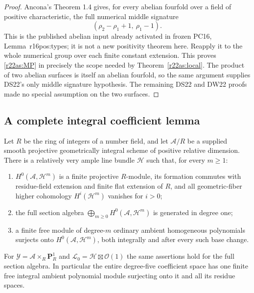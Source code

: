 \begin{proof}
Ancona's Theorem 1.4 gives, for every abelian fourfold
over a field of positive characteristic, the full
numerical middle signature
\[
                 (\rho_2-\rho_1+1,\ \rho_1-1).
 \tag{AS22.2}\label{r22as:Ancona}
\]
This is the published abelian input already activated
in frozen PC16, Lemma~\textup{r16pos:types}; it is not a
new positivity theorem here.  Reapply it to the whole
numerical group over each finite constant extension.
This proves \eqref{r22as:MP} in precisely the scope
needed by Theorem~\ref{r22as:local}.  The product of
two abelian surfaces is itself an abelian fourfold,
so the same argument supplies DS22's only middle
signature hypothesis.  The remaining DS22 and DW22
proofs made no special assumption on the two surfaces.
\end{proof}

\subsection{A complete integral coefficient lemma}

\begin{lemma}
\label{r22as:coeff}
Let $R$ be the ring of integers of a number field, and
let $\mathcal A/R$ be a supplied smooth projective
geometrically integral scheme of positive relative
dimension.  There is a relatively very ample line
bundle $\mathcal H$ such that, for every $m\ge1$:
\begin{enumerate}
\item $H^0(\mathcal A,\mathcal H^m)$ is a finite
projective $R$-module, its formation commutes with
residue-field extension and finite flat extension of
$R$, and all geometric-fiber higher cohomology
$H^i(\mathcal H^m)$ vanishes for $i>0$;
\item the full section algebra
$\bigoplus_{m\ge0}H^0(\mathcal A,\mathcal H^m)$ is
generated in degree one;
\item a finite free module of degree-$m$ ordinary
ambient homogeneous polynomials surjects onto
$H^0(\mathcal A,\mathcal H^m)$, both integrally and
after every such base change.
\end{enumerate}
For $\mathcal Y=\mathcal A\times_R\mathbf P^1_R$ and
$\mathcal L_0=\mathcal H\boxtimes\mathcal O(1)$ the
same assertions hold for the full section algebra.
In particular the entire degree-five coefficient
space has one finite free integral ambient polynomial
module surjecting onto it and all its residue spaces.
\end{lemma}

